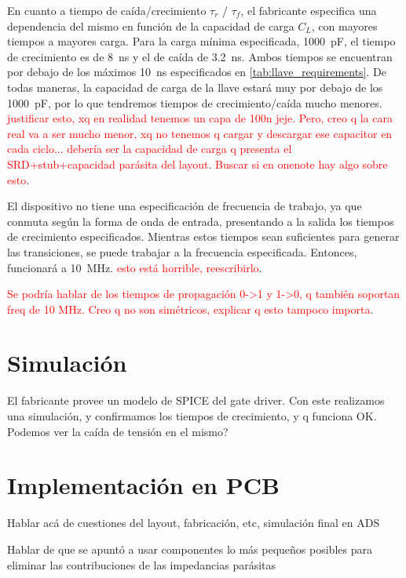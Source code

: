 En cuanto a tiempo de caída/crecimiento $\tau_{r}$ / $\tau_{f}$, el fabricante
especifica una dependencia del mismo en función de la capacidad de carga $C_L$,
con mayores tiempos a mayores carga. Para la carga mínima especificada,
\qty{1000}{\pico\farad}, el tiempo de crecimiento es de \qty{8}{\nano\second} y
el de caída de \qty{3.2}{\nano\second}. Ambos tiempos se encuentran por debajo
de los máximos \qty{10}{\nano\second} especificados en
\ref{tab:llave_requirements}. De todas maneras, la capacidad de carga de la
llave estará muy por debajo de los \qty{1000}{\pico\farad}, por lo que tendremos
tiempos de crecimiento/caída mucho menores. \textcolor{red}{justificar esto, xq
en realidad tenemos un capa de 100n jeje. Pero, creo q la cara real va a ser
mucho menor, xq no tenemos q cargar y descargar ese capacitor en cada ciclo...
debería ser la capacidad de carga q presenta el SRD+stub+capacidad parásita del
layout}.  \textcolor{red}{Buscar si en onenote hay algo sobre esto}.

El dispositivo no tiene una especificación de frecuencia de trabajo, ya que
conmuta según la forma de onda de entrada, presentando a la salida los tiempos
de crecimiento especificados. Mientras estos tiempos sean suficientes para
generar las transiciones, se puede trabajar a la frecuencia especificada.
Entonces, funcionará a \qty{10}{\mega\hertz}. \textcolor{red}{esto está
horrible, reescribirlo}.

\textcolor{red}{Se podría hablar de los tiempos de propagación 0->1 y 1->0, q
también soportan freq de 10 MHz. Creo q no son simétricos, explicar q esto
tampoco importa}.

\section{Simulación}

El fabricante provee un modelo de SPICE del gate driver. Con este realizamos una
simulación, y confirmamos los tiempos de crecimiento, y q funciona OK. Podemos
ver la caída de tensión en el mismo?

\section{Implementación en PCB}

Hablar acá de cuestiones del layout, fabricación, etc, simulación final en ADS

Hablar de que se apuntó a usar componentes lo más pequeños posibles para
eliminar las contribuciones de las impedancias parásitas
